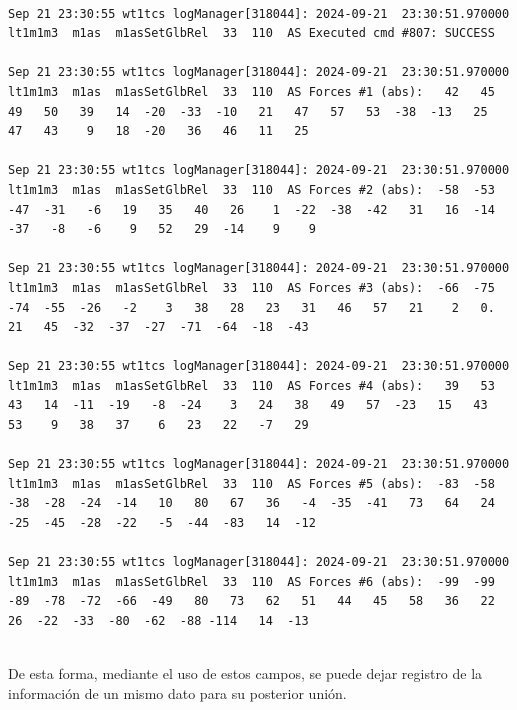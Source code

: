 \begin{enumerate}
  \begin{listing}[!ht]
    \caption{\label{myverbatim:fuerza_ejemplo} Ejemplos de fuerzas aplicadas}
    \begin{verbatim}

Sep 21 23:30:55 wt1tcs logManager[318044]: 2024-09-21  23:30:51.970000  lt1m1m3  m1as  m1asSetGlbRel  33  110  AS Executed cmd #807: SUCCESS

Sep 21 23:30:55 wt1tcs logManager[318044]: 2024-09-21  23:30:51.970000  lt1m1m3  m1as  m1asSetGlbRel  33  110  AS Forces #1 (abs):   42   45   49   50   39   14  -20  -33  -10   21   47   57   53  -38  -13   25   47   43    9   18  -20   36   46   11   25

Sep 21 23:30:55 wt1tcs logManager[318044]: 2024-09-21  23:30:51.970000  lt1m1m3  m1as  m1asSetGlbRel  33  110  AS Forces #2 (abs):  -58  -53  -47  -31   -6   19   35   40   26    1  -22  -38  -42   31   16  -14  -37   -8   -6    9   52   29  -14    9    9

Sep 21 23:30:55 wt1tcs logManager[318044]: 2024-09-21  23:30:51.970000  lt1m1m3  m1as  m1asSetGlbRel  33  110  AS Forces #3 (abs):  -66  -75  -74  -55  -26   -2    3   38   28   23   31   46   57   21    2   0.   21   45  -32  -37  -27  -71  -64  -18  -43

Sep 21 23:30:55 wt1tcs logManager[318044]: 2024-09-21  23:30:51.970000  lt1m1m3  m1as  m1asSetGlbRel  33  110  AS Forces #4 (abs):   39   53   43   14  -11  -19   -8  -24    3   24   38   49   57  -23   15   43   53    9   38   37    6   23   22   -7   29

Sep 21 23:30:55 wt1tcs logManager[318044]: 2024-09-21  23:30:51.970000  lt1m1m3  m1as  m1asSetGlbRel  33  110  AS Forces #5 (abs):  -83  -58  -38  -28  -24  -14   10   80   67   36   -4  -35  -41   73   64   24  -25  -45  -28  -22   -5  -44  -83   14  -12

Sep 21 23:30:55 wt1tcs logManager[318044]: 2024-09-21  23:30:51.970000  lt1m1m3  m1as  m1asSetGlbRel  33  110  AS Forces #6 (abs):  -99  -99  -89  -78  -72  -66  -49   80   73   62   51   44   45   58   36   22   26  -22  -33  -80  -62  -88 -114   14  -13
    
        \end{verbatim}
    \end{listing}

De esta forma, mediante el uso de estos campos, se puede dejar registro de la información de un mismo dato para su posterior unión.

\end{enumerate}